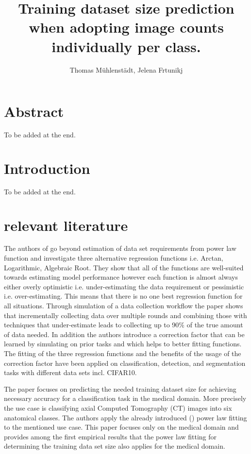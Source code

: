 \documentclass{article} %
\title{Training dataset size prediction when adopting image counts individually per class.}
\author{Thomas Mühlenstädt, Jelena Frtunikj}
\begin{document}
\maketitle

\section*{Abstract}

To be added at the end.

\section{Introduction}

To be added at the end.


\section{relevant literature}
The authors of \cite{mahmood2022data} go beyond estimation of data set requirements from power law function and investigate three alternative regression functions i.e. Arctan, Logarithmic, Algebraic Root. They show that all of the functions are well-suited towards estimating model performance however each function is almost always either overly optimistic i.e. under-estimating the data requirement or pessimistic i.e. over-estimating. This means that there is no one best regression function for all situations. Through simulation of a data collection workflow the paper shows that incrementally collecting data over multiple rounds and combining those with techniques that under-estimate leads to collecting up to 90\% of the true amount of data needed. In addition the authors introduce a correction factor that can be learned by simulating on prior tasks and which helps to better fitting functions. The fitting of the three regression functions and the benefits of the usage of the correction factor have been applied on classification, detection, and segmentation tasks with different data sets incl. CIFAR10.

The paper \cite{cho2016data} focuses on predicting the needed training dataset size for achieving necessary accuracy for a classification task in the medical domain. More precisely the use case is classifying axial Computed Tomography (CT) images into six anatomical classes. The authors apply the already introduced (\cite{Figueroa2012PredictingSampleSizeForClass}) power law fitting to the mentioned use case. This paper focuses only on the medical domain and provides among the first empirical results that the power law fitting for determining the training data set size also applies for the medical domain.
\end{document}
